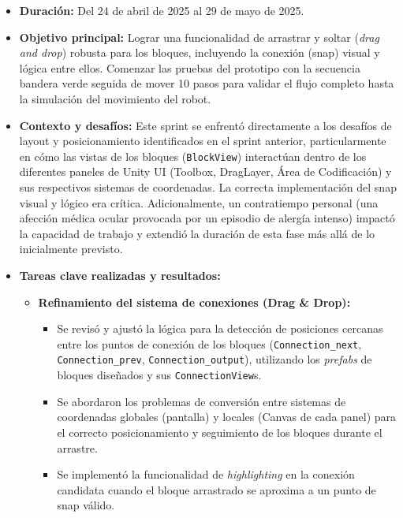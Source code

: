    \begin{itemize}
		\item \textbf{Duración:} Del 24 de abril de 2025 al 29 de mayo de 2025.
	\item \textbf{Objetivo principal:} Lograr una funcionalidad de arrastrar y soltar (\textit{drag and drop}) robusta para los bloques, incluyendo la conexión (snap) visual y lógica entre ellos. Comenzar las pruebas del prototipo con la secuencia bandera verde seguida de mover 10 pasos para validar el flujo completo hasta la simulación del movimiento del robot.
	\item \textbf{Contexto y desafíos:} Este sprint se enfrentó directamente a los desafíos de layout y posicionamiento identificados en el sprint anterior, particularmente en cómo las vistas de los bloques (\texttt{BlockView}) interactúan dentro de los diferentes paneles de Unity UI (Toolbox, DragLayer, Área de Codificación) y sus respectivos sistemas de coordenadas. La correcta implementación del snap visual y lógico era crítica. Adicionalmente, un contratiempo personal (una afección médica ocular provocada por un episodio de alergía intenso) impactó la capacidad de trabajo y extendió la duración de esta fase más allá de lo inicialmente previsto.
	\item \textbf{Tareas clave realizadas y resultados:}
	\begin{itemize}
		\item \textbf{Refinamiento del sistema de conexiones (Drag \& Drop):}
		\begin{itemize}
			\item Se revisó y ajustó la lógica para la detección de posiciones cercanas entre los puntos de conexión de los bloques (\texttt{Connection\_next}, \texttt{Connection\_prev}, \texttt{Connection\_output}), utilizando los \textit{prefabs} de bloques diseñados y sus \texttt{ConnectionView}s.
			\item Se abordaron los problemas de conversión entre sistemas de coordenadas globales (pantalla) y locales (Canvas de cada panel) para el correcto posicionamiento y seguimiento de los bloques durante el arrastre.
			\item Se implementó la funcionalidad de \textit{highlighting}  en la conexión candidata cuando el bloque arrastrado se aproxima a un punto de snap válido.
			

\end{itemize}
\end{itemize}
\end{itemize}
